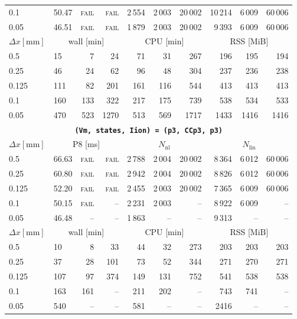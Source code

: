 \documentclass[11pt,a4paper]{article}
\newcommand{\code}[1]{\texttt{\small #1}}
\begin{document}
\begin{center}
\begin{longtable}{l|lrr|rrr|rrr}
0.1 & 50.47 & \textsc{fail} & \textsc{fail} & 2\,554 & 2\,003 & 20\,002 & 10\,214 & 6\,009 & 60\,006\\
0.05 & 46.51 & \textsc{fail} & \textsc{fail} & 1\,879 & 2\,003 & 20\,002 & 9\,393 & 6\,009 & 60\,006\\
\hline
$ \Delta x [\text{mm}] $ & \multicolumn{3}{c|}{wall [min]} & \multicolumn{3}{c|}{CPU [min]} & \multicolumn{3}{c|}{RSS [MiB]}\\
0.5 & 15 & 7 & 24 & 71 & 31 & 267 & 196 & 195 & 194\\
0.25 & 46 & 24 & 62 & 96 & 48 & 304 & 237 & 236 & 238\\
0.125 & 111 & 82 & 201 & 161 & 116 & 544 & 413 & 413 & 413\\
0.1 & 160 & 133 & 322 & 217 & 175 & 739 & 538 & 534 & 533\\
0.05 & 470 & 523 & 1270 & 513 & 569 & 1717 & 1433 & 1416 & 1416\\
\hline
\hline
\multicolumn{10}{c}{\textbf{\code{(Vm, states, Iion) = (p3, CCp3, p3)}}}\\\hline
$ \Delta x [\text{mm}] $ & \multicolumn{3}{c|}{P8 [ms]} & \multicolumn{3}{c|}{$N_{\mathrm{nl}}$} & \multicolumn{3}{c|}{$N_{\mathrm{lin}}$}\\
0.5 & 66.63 & \textsc{fail} & \textsc{fail} & 2\,788 & 2\,004 & 20\,002 & 8\,364 & 6\,012 & 60\,006\\
0.25 & 60.80 & \textsc{fail} & \textsc{fail} & 2\,942 & 2\,004 & 20\,002 & 8\,826 & 6\,012 & 60\,006\\
0.125 & 52.20 & \textsc{fail} & \textsc{fail} & 2\,455 & 2\,003 & 20\,002 & 7\,365 & 6\,009 & 60\,006\\
0.1 & 50.15 & \textsc{fail} & -- & 2\,231 & 2\,003 & -- & 8\,922 & 6\,009 & --\\
0.05 & 46.48 & -- & -- & 1\,863 & -- & -- & 9\,313 & -- & --\\
\hline
$ \Delta x [\text{mm}] $ & \multicolumn{3}{c|}{wall [min]} & \multicolumn{3}{c|}{CPU [min]} & \multicolumn{3}{c|}{RSS [MiB]}\\
0.5 & 10 & 8 & 33 & 44 & 32 & 273 & 203 & 203 & 203\\
0.25 & 37 & 28 & 101 & 73 & 52 & 344 & 271 & 270 & 271\\
0.125 & 107 & 97 & 374 & 149 & 131 & 752 & 541 & 538 & 538\\
0.1 & 163 & 161 & -- & 211 & 202 & -- & 743 & 741 & --\\
0.05 & 540 & -- & -- & 581 & -- & -- & 2416 & -- & --\\
\hline
\bottomrule\end{longtable}\end{center}
\end{document}
